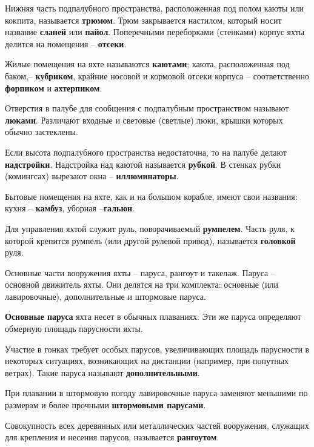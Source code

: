 \documentclass[a4paper, 12pt, twoside, final]{scrbook}
\begin{document}
Нижняя часть подпалубного пространства, расположенная под полом каюты
или кокпита, называется \textbf{трюмом}. Трюм закрывается
настилом, который носит название \textbf{сланей}
или \textbf{пайол}. Поперечными переборками (стенками)
корпус яхты делится на помещения \--- \textbf{отсеки}.

Жилые помещения на яхте называются \textbf{каютами};
каюта, расположенная под баком,\--- \textbf{кубриком},
крайние носовой и кормовой отсеки корпуса \--- соответственно \textbf{форпиком}
и \textbf{ахтерпиком}.

Отверстия в палубе для сообщения с подпалубным пространством называют
\textbf{люками}. Различают входные и световые (светлые)
люки, крышки которых обычно застеклены.

Если высота подпалубного пространства недостаточна, то на палубе делают
\textbf{надстройки}. Надстройка над каютой
называется \textbf{рубкой}. В стенках рубки (комингсах)
вырезают окна \--- \textbf{иллюминаторы}.

Бытовые помещения на яхте, как и на большом корабле, имеют свои названия:
кухня \--- \textbf{камбуз}, уборная \---\textbf{гальюн}.

Для управления яхтой служит руль, поворачиваемый \textbf{румпелем}.
Часть руля, к которой крепится румпель (или другой рулевой привод),
называется \textbf{головкой }руля.

Основные части вооружения яхты \--- паруса, рангоут и такелаж. Паруса
\--- основной движитель яхты. Они делятся на три комплекта: основные
(или лавировочные), дополнительные и штормовые паруса.

\textbf{Основные паруса} яхта
несет в обычных плаваниях. Эти же паруса определяют обмерную площадь
парусности яхты.

Участие в гонках требует особых парусов, увеличивающих площадь парусности
в некоторых ситуациях, возникающих на дистанции (например, при попутных
ветрах). Такие паруса называют \textbf{дополнительными}.

При плавании в штормовую погоду лавировочные паруса заменяют меньшими
по размерам и более прочными \textbf{штормовыми парусами}.

Совокупность всех деревянных или металлических частей вооружения,
служащих для крепления и несения парусов, называется \textbf{рангоутом}. 
\end{document}
